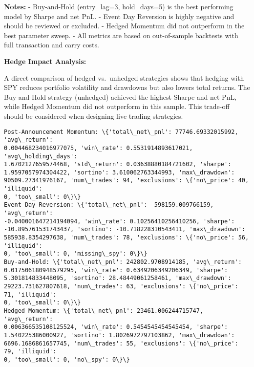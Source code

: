 \documentclass[11pt]{article}
\begin{document}
\textbf{Notes:} - Buy-and-Hold (entry\_lag=3, hold\_days=5) is the best
performing model by Sharpe and net PnL. - Event Day Reversion is highly
negative and should be reviewed or excluded. - Hedged Momentum did not
outperform in the best parameter sweep. - All metrics are based on
out-of-sample backtests with full transaction and carry costs.

\textbf{Hedge Impact Analysis:}

A direct comparison of hedged vs.~unhedged strategies shows that hedging
with SPY reduces portfolio volatility and drawdowns but also lowers
total returns. The Buy-and-Hold strategy (unhedged) achieved the highest
Sharpe and net PnL, while Hedged Momentum did not outperform in this
sample. This trade-off should be considered when designing live trading
strategies.

    \begin{Verbatim}[commandchars=\\\{\}]
Post-Announcement Momentum: \{'total\_net\_pnl': 77746.69332015992, 'avg\_return':
0.004468234016977075, 'win\_rate': 0.5531914893617021, 'avg\_holding\_days':
1.6702127659574468, 'std\_return': 0.03638880184721602, 'sharpe':
1.9597057974304422, 'sortino': 3.610062763344993, 'max\_drawdown':
90509.27341976167, 'num\_trades': 94, 'exclusions': \{'no\_price': 40, 'illiquid':
0, 'too\_small': 0\}\}
Event Day Reversion: \{'total\_net\_pnl': -598159.009766159, 'avg\_return':
-0.040001647214194094, 'win\_rate': 0.10256410256410256, 'sharpe':
-10.895761531743437, 'sortino': -10.718228310543411, 'max\_drawdown':
585938.8354297638, 'num\_trades': 78, 'exclusions': \{'no\_price': 56, 'illiquid':
0, 'too\_small': 0, 'missing\_spy': 0\}\}
Buy-and-Hold: \{'total\_net\_pnl': 242802.9708914185, 'avg\_return':
0.017506180948579295, 'win\_rate': 0.6349206349206349, 'sharpe':
5.301814833448095, 'sortino': 28.48449061258461, 'max\_drawdown':
29223.731627807618, 'num\_trades': 63, 'exclusions': \{'no\_price': 71, 'illiquid':
0, 'too\_small': 0\}\}
Hedged Momentum: \{'total\_net\_pnl': 23461.006244715747, 'avg\_return':
0.006366535108125524, 'win\_rate': 0.5454545454545454, 'sharpe':
1.540225386000927, 'sortino': 1.8026972797103862, 'max\_drawdown':
6696.1686861657745, 'num\_trades': 55, 'exclusions': \{'no\_price': 79, 'illiquid':
0, 'too\_small': 0, 'no\_spy': 0\}\}
    \end{Verbatim}

    \begin{center}
    \end{center}
    { \hspace*{\fill} \\}
    
\end{document}
